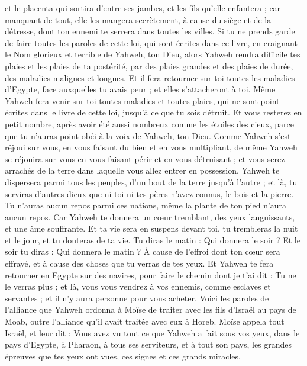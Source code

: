\begin{multicols}{2}
et le placenta qui sortira d'entre ses jambes, et les fils qu'elle enfantera ; car manquant de tout, elle les mangera secrètement, à cause du siège et de la détresse, dont ton ennemi te serrera dans toutes les villes.
Si tu ne prends garde de faire toutes les paroles de cette loi, qui sont écrites dans ce livre, en craignant le Nom glorieux et terrible de Yahweh, ton Dieu,
alors Yahweh rendra difficile tes plaies et les plaies de ta postérité, par des plaies grandes et des plaies de durée, des maladies malignes et longues.
Et il fera retourner sur toi toutes les maladies d'Egypte, face auxquelles tu avais peur ; et elles s'attacheront à toi.
Même Yahweh fera venir sur toi toutes maladies et toutes plaies, qui ne sont point écrites dans le livre de cette loi, jusqu'à ce que tu sois détruit.
Et vous resterez en petit nombre, après avoir été aussi nombreux comme les étoiles des cieux, parce que tu n'auras point obéi à la voix de Yahweh, ton Dieu.
Comme Yahweh s'est réjoui sur vous, en vous faisant du bien et en vous multipliant, de même Yahweh se réjouira sur vous en vous faisant périr et en vous détruisant ; et vous serez arrachés de la terre dans laquelle vous allez entrer en possession.
Yahweh te dispersera parmi tous les peuples, d'un bout de la terre jusqu'à l'autre ; et là, tu serviras d'autres dieux que ni toi ni tes pères n'avez connus, le bois et la pierre.
Tu n'auras aucun repos parmi ces nations, même la plante de ton pied n'aura aucun repos. Car Yahweh te donnera un cœur tremblant, des yeux languissants, et une âme souffrante.
Et ta vie sera en suspens devant toi, tu trembleras la nuit et le jour, et tu douteras de ta vie.
Tu diras le matin : Qui donnera le soir ? Et le soir tu diras : Qui donnera le matin ? À cause de l'effroi dont ton cœur sera effrayé, et à cause des choses que tu verras de tes yeux.
Et Yahweh te fera retourner en Egypte sur des navires, pour faire le chemin dont je t'ai dit : Tu ne le verras plus ; et là, vous vous vendrez à vos ennemis, comme esclaves et servantes ; et il n'y aura personne pour vous acheter.
\VerseOne{}Voici les paroles de l'alliance que Yahweh ordonna à Moïse de traiter avec les fils d'Israël au pays de Moab, outre l'alliance qu'il avait traitée avec eux à Horeb.
Moïse appela tout Israël, et leur dit : Vous avez vu tout ce que Yahweh a fait sous vos yeux, dans le pays d'Egypte, à Pharaon, à tous ses serviteurs, et à tout son pays,
les grandes épreuves que tes yeux ont vues, ces signes et ces grands miracles.

\end{multicols}
